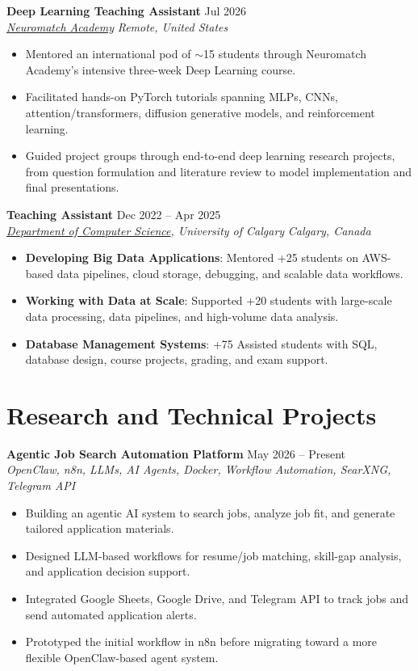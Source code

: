 \documentclass[a4paper,10pt]{article}
\newcommand{\resumeSubheading}[4]{
    \textbf{#1} \hfill #2 \\
    \textit{#3} \hfill \textit{#4}
}
\begin{document}
\resumeSubheading
{Deep Learning Teaching Assistant}
{Jul 2026}
{\href{https://neuromatch.io/}{Neuromatch Academy}}
{Remote, United States}
\begin{itemize}[leftmargin=0.25in]
    \item Mentored an international pod of $\sim$15 students through Neuromatch Academy's intensive three-week Deep Learning course.
    \item Facilitated hands-on PyTorch tutorials spanning MLPs, CNNs, attention/transformers, diffusion generative models, and reinforcement learning.
    \item Guided project groups through end-to-end deep learning research projects, from question formulation and literature review to model implementation and final presentations.
\end{itemize}

\resumeSubheading
{Teaching Assistant}
{Dec 2022 -- Apr 2025}
{\href{https://science.ucalgary.ca/computer-science} {Department of Computer Science}, University of Calgary}
{Calgary, Canada}
\begin{itemize}[leftmargin=0.25in]
    \item \textbf{Developing Big Data Applications}: Mentored +25 students on AWS-based data pipelines, cloud storage, debugging, and scalable data workflows. 
    \item \textbf{Working with Data at Scale}: Supported +20 students with large-scale data processing, data pipelines, and high-volume data analysis. 
    \item \textbf{Database Management Systems}: +75 Assisted students with SQL, database design, course projects, grading, and exam support.
\end{itemize}


\section*{Research and Technical Projects}

\noindent
\textbf{Agentic Job Search Automation Platform} \hfill May 2026 -- Present \\
\textit{OpenClaw, n8n, LLMs, AI Agents, Docker, Workflow Automation, SearXNG, Telegram API}
\begin{itemize}[leftmargin=0.25in]
    \item Building an agentic AI system to search jobs, analyze job fit, and generate tailored application materials.
    \item Designed LLM-based workflows for resume/job matching, skill-gap analysis, and application decision support.
    \item Integrated Google Sheets, Google Drive, and Telegram API to track jobs and send automated application alerts.
    \item Prototyped the initial workflow in n8n before migrating toward a more flexible OpenClaw-based agent system.
\end{itemize}
\end{document}
